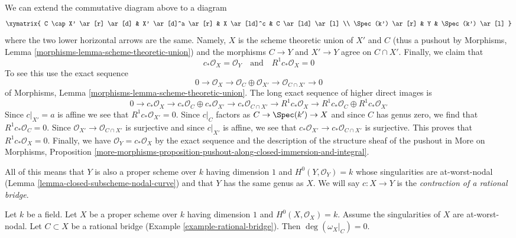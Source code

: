 \begin{example}
\medskip\noindent
We can extend the commutative diagram above to a diagram
$$
\xymatrix{
C \cap X' \ar[r] \ar[d] &
X' \ar[d]^a \ar[r] & X \ar[ld]^c &
C \ar[ld] \ar[l] \\
\Spec(k') \ar[r] &
Y &
\Spec(k') \ar[l]
}
$$
where the two lower horizontal arrows are the same. Namely, $X$ is the
scheme theoretic union of $X'$ and $C$ (thus a pushout by
Morphisms, Lemma \ref{morphisms-lemma-scheme-theoretic-union})
and the morphisms $C \to Y$ and $X' \to Y$ agree on $C \cap X'$.
Finally, we claim that
$$
c_*\mathcal{O}_X = \mathcal{O}_Y
\quad\text{and}\quad
R^1c_*\mathcal{O}_X = 0
$$
To see this use the exact sequence
$$
0 \to \mathcal{O}_X \to
\mathcal{O}_C \oplus \mathcal{O}_{X'} \to
\mathcal{O}_{C \cap X'} \to 0
$$
of Morphisms, Lemma \ref{morphisms-lemma-scheme-theoretic-union}.
The long exact sequence of higher direct images is
$$
0 \to c_*\mathcal{O}_X \to c_*\mathcal{O}_C \oplus c_*\mathcal{O}_{X'} \to
c_*\mathcal{O}_{C \cap X'} \to
R^1c_*\mathcal{O}_X \to
R^1c_*\mathcal{O}_C \oplus R^1c_*\mathcal{O}_{X'}
$$
Since $c|_{X'} = a$ is affine we see that
$R^1c_*\mathcal{O}_{X'} = 0$.
Since $c|_C$ factors as $C \to \Spec(k') \to X$ and since
$C$ has genus zero, we find that $R^1c_*\mathcal{O}_C = 0$.
Since $\mathcal{O}_{X'} \to \mathcal{O}_{C \cap X'}$ is
surjective and since $c|_{X'}$ is affine, we see that
$c_*\mathcal{O}_{X'} \to c_*\mathcal{O}_{C \cap X'}$
is surjective. This proves that $R^1c_*\mathcal{O}_X = 0$.
Finally, we have
$\mathcal{O}_Y = c_*\mathcal{O}_X$ by
the exact sequence and
the description of the structure sheaf of the pushout
in More on Morphisms, Proposition
\ref{more-morphisms-proposition-pushout-along-closed-immersion-and-integral}.

\medskip\noindent
All of this means that $Y$ is also a proper scheme over $k$
having dimension $1$ and $H^0(Y, \mathcal{O}_Y) = k$
whose singularities are at-worst-nodal
(Lemma \ref{lemma-closed-subscheme-nodal-curve})
and that $Y$ has the same genus as $X$.
We will say $c : X \to Y$ is the
{\it contraction of a rational bridge}.
\end{example}

\begin{lemma}
\label{lemma-rational-bridge-zero}
Let $k$ be a field. Let $X$ be a proper scheme over $k$ having dimension $1$
and $H^0(X, \mathcal{O}_X) = k$. Assume the singularities of $X$ are
at-worst-nodal. Let $C \subset X$ be a rational bridge
(Example \ref{example-rational-bridge}). Then $\deg(\omega_X|_C) = 0$.
\end{lemma}

